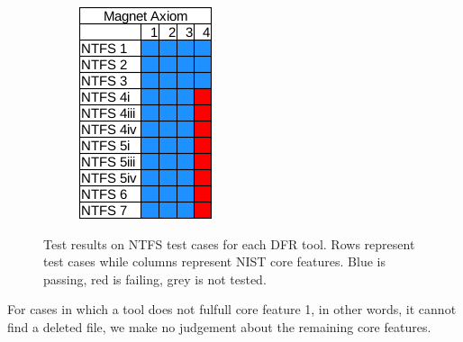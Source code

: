 \begin{figure}
\begin{subfigure}{0.16\linewidth}
        \includegraphics[width=\linewidth]{fig/axiom_results_ntfs.png}
    \end{subfigure}
        
    \caption{Test results on NTFS test cases for each DFR tool. Rows represent test cases while columns represent NIST core features. Blue is passing, red is failing, grey is not tested.}
    \label{fig:results_ntfs}
\end{figure}

For cases in which a tool does not fulfull core feature 1, in other words, it cannot find a deleted file, we make no judgement about the remaining core features.


